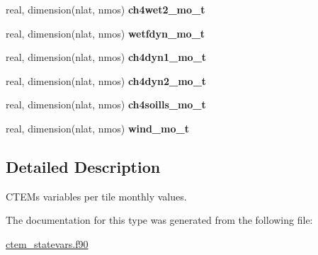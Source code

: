 \begin{DoxyCompactItemize}
\item 
\hypertarget{structctem__statevars_1_1ctem__tileavg__monthly_a290af0f02199782f5fb2f6c5c52935ca}{}real, dimension(nlat, nmos) {\bfseries ch4wet2\+\_\+mo\+\_\+t}\label{structctem__statevars_1_1ctem__tileavg__monthly_a290af0f02199782f5fb2f6c5c52935ca}

\item 
\hypertarget{structctem__statevars_1_1ctem__tileavg__monthly_a71f66d6faf89f7301ca61c4bccfe0292}{}real, dimension(nlat, nmos) {\bfseries wetfdyn\+\_\+mo\+\_\+t}\label{structctem__statevars_1_1ctem__tileavg__monthly_a71f66d6faf89f7301ca61c4bccfe0292}

\item 
\hypertarget{structctem__statevars_1_1ctem__tileavg__monthly_a095478d1c105d2ba548b5b5167382e61}{}real, dimension(nlat, nmos) {\bfseries ch4dyn1\+\_\+mo\+\_\+t}\label{structctem__statevars_1_1ctem__tileavg__monthly_a095478d1c105d2ba548b5b5167382e61}

\item 
\hypertarget{structctem__statevars_1_1ctem__tileavg__monthly_a7285bce2de6e11bb4a637da6d3c55b65}{}real, dimension(nlat, nmos) {\bfseries ch4dyn2\+\_\+mo\+\_\+t}\label{structctem__statevars_1_1ctem__tileavg__monthly_a7285bce2de6e11bb4a637da6d3c55b65}

\item 
\hypertarget{structctem__statevars_1_1ctem__tileavg__monthly_ad6857a2d1268a5c62b692476b4b7a0b9}{}real, dimension(nlat, nmos) {\bfseries ch4soills\+\_\+mo\+\_\+t}\label{structctem__statevars_1_1ctem__tileavg__monthly_ad6857a2d1268a5c62b692476b4b7a0b9}

\item 
\hypertarget{structctem__statevars_1_1ctem__tileavg__monthly_a157869190905f9f41954b386a7e8a350}{}real, dimension(nlat, nmos) {\bfseries wind\+\_\+mo\+\_\+t}\label{structctem__statevars_1_1ctem__tileavg__monthly_a157869190905f9f41954b386a7e8a350}

\end{DoxyCompactItemize}


\subsection{Detailed Description}
C\+T\+E\+M\textquotesingle{}s variables per tile monthly values. 

The documentation for this type was generated from the following file\+:\begin{DoxyCompactItemize}
\item 
\hyperlink{ctem__statevars_8f90}{ctem\+\_\+statevars.\+f90}\end{DoxyCompactItemize}
